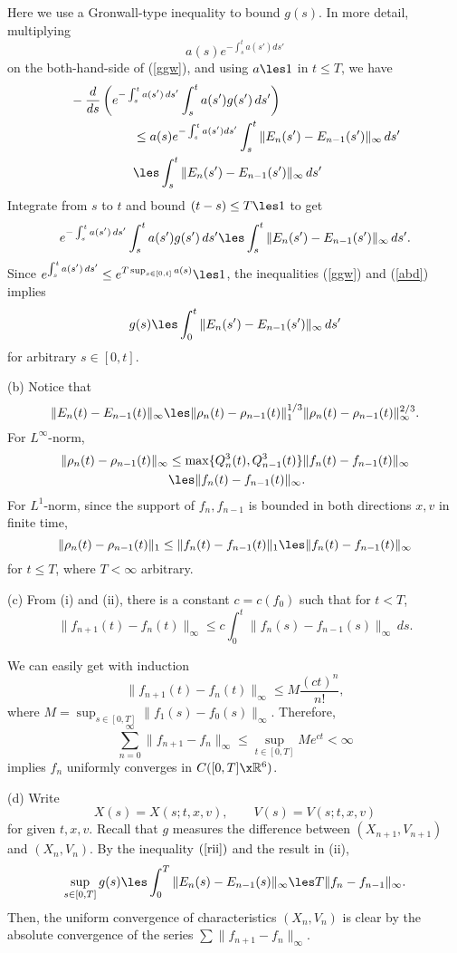 \documentclass[11pt]{amsart}
\begin{document}
\begin{pf}
Here we use a Gronwall-type inequality to bound $g(s)$.
In more detail, multiplying
\[a(s)e^{-\int_s^ta(s')ds'}\]
on the both-hand-side of (\ref{ggw}), and using $a\les 1$ in $t\le T$, we have
\begin{align*}
&-\dd{s}\left(e^{-\int_s^ta(s')\,ds'}\int_s^ta(s')g(s')\,ds'\right)\\
&\hspace{5em}\le a(s)e^{-\int_s^ta(s')ds'}\int_s^t\|E_n(s')-E_{n-1}(s')\|_\infty\,ds'\\
&\hspace{5em}\les\int_s^t\|E_n(s')-E_{n-1}(s')\|_\infty\,ds'
\end{align*}
Integrate from $s$ to $t$ and bound $(t-s)\le T\les1$ to get
\begin{align}\label{abd}
e^{-\int_s^ta(s')\,ds'}\int_s^ta(s')g(s')\,ds'\les\int_s^t\|E_n(s')-E_{n-1}(s')\|_\infty\,ds'.
\end{align}
Since $e^{\int_s^ta(s')\,ds'}\le e^{T\sup_{s\in[0,t]}a(s)}\les1$, the inequalities (\ref{ggw}) and (\ref{abd}) implies
\begin{align}\label{rii}
g(s)\les\int_0^t\|E_n(s')-E_{n-1}(s')\|_\infty\,ds'
\end{align}
for arbitrary $s\in[0,t]$.

(b)
Notice that
\[\|E_n(t)-E_{n-1}(t)\|_\infty\les\|\rho_n(t)-\rho_{n-1}(t)\|_1^{1/3}\|\rho_n(t)-\rho_{n-1}(t)\|_\infty^{2/3}.\]
For $L^\infty$-norm,
\begin{align*}
\|\rho_n(t)-\rho_{n-1}(t)\|_\infty
&\le\max\{Q_n^3(t),Q_{n-1}^3(t)\}\|f_n(t)-f_{n-1}(t)\|_\infty\\
&\les\|f_n(t)-f_{n-1}(t)\|_\infty.
\end{align*}
For $L^1$-norm, since the support of $f_n,f_{n-1}$ is bounded in both directions $x,v$ in finite time,
\[\|\rho_n(t)-\rho_{n-1}(t)\|_1\le\|f_n(t)-f_{n-1}(t)\|_1\les\|f_n(t)-f_{n-1}(t)\|_\infty\]
for $t\le T$, where $T<\infty$ arbitrary.

(c)
From (i) and (ii), there is a constant $c=c(f_0)$ such that for $t<T$,
\[\|f_{n+1}(t)-f_n(t)\|_\infty\le c\int_0^t\|f_n(s)-f_{n-1}(s)\|_\infty\,ds.\]

We can easily get with induction
\[\|f_{n+1}(t)-f_n(t)\|_\infty\le M\frac{(ct)^n}{n!},\]
where $M=\sup_{s\in[0,T]}\|f_1(s)-f_0(s)\|_\infty$.
Therefore,
\[\sum_{n=0}^\infty\|f_{n+1}-f_n\|_\infty\le\sup_{t\in[0,T]}Me^{ct}<\infty\]
implies $f_n$ uniformly converges in $C([0,T]\x\R^6)$.

(d)
Write
\[X(s)=X(s;t,x,v),\qquad V(s)=V(s;t,x,v)\]
for given $t,x,v$.
Recall that $g$ measures the difference between $(X_{n+1},V_{n+1})$ and $(X_n,V_n)$.
By the inequality $(\ref{rii})$ and the result in (ii),
\begin{align*}
\sup_{s\in[0,T]}g(s)\les\int_0^T\|E_n(s)-E_{n-1}(s)\|_\infty\les T\|f_n-f_{n-1}\|_\infty.
\end{align*}
Then, the uniform convergence of characteristics $(X_n,V_n)$ is clear by the absolute convergence of the series $\sum\|f_{n+1}-f_n\|_\infty$.


\end{pf}
\end{document}

